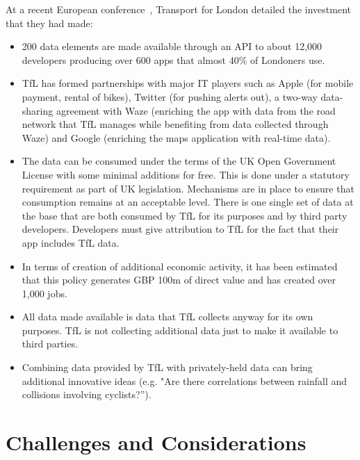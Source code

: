 At a recent European conference~\citep{api_industrial_data}, Transport for London detailed the investment that they had made:
\begin{itemize}
	\item 200 data elements are made available through an API to about 12,000
	developers producing over 600 apps that almost 40\% of Londoners use.
	
	\item TfL has formed partnerships with major IT players such as Apple
	(for mobile payment, rental of bikes), Twitter (for pushing alerts out),
	a two-way data-sharing agreement with Waze (enriching the app with data
	from the road network that TfL manages while benefiting from data collected
	through Waze) and Google (enriching the maps application with real-time data).
	
	\item The data can be consumed under the terms of the UK Open Government
	License with some minimal additions for free. This is done under a statutory
	requirement as part of UK legislation. Mechanisms are in place to ensure that
	consumption remains at an acceptable level. There is one single set of data
	at the base that are both consumed by TfL for its purposes and by third	party
	developers. Developers must give attribution to TfL for the fact that their
	app includes TfL data.
	
	\item In terms of creation of additional economic activity, it has been
	estimated that this policy	generates GBP 100m of direct value and has created
	over 1,000 jobs.
	
	\item All data made available is data that TfL collects anyway for its own
	purposes. TfL is not collecting additional data just to make it available to
	third parties.
	
	\item Combining data provided by TfL with privately-held data can bring additional innovative ideas (e.g. "Are	there correlations between rainfall and collisions involving cyclists?”).
\end{itemize}

\section{Challenges and Considerations}

